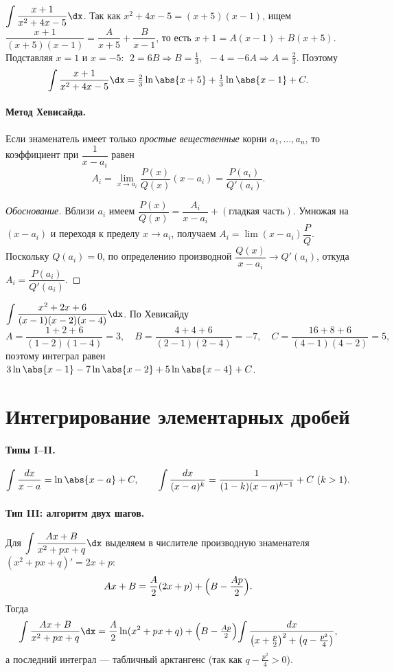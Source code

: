 \begin{example}
$\displaystyle\int\frac{x+1}{x^2+4x-5}\dx$. Так как $x^2+4x-5=(x+5)(x-1)$, ищем
$\dfrac{x+1}{(x+5)(x-1)}=\dfrac{A}{x+5}+\dfrac{B}{x-1}$, то есть $x+1=A(x-1)+B(x+5)$. Подставляя
$x=1$ и $x=-5$: $\;2=6B\Rightarrow B=\tfrac13$, $\;-4=-6A\Rightarrow A=\tfrac23$. Поэтому
\[
  \int\frac{x+1}{x^2+4x-5}\dx=\tfrac23\ln\abs{x+5}+\tfrac13\ln\abs{x-1}+C.
\]
\end{example}

\paragraph{Метод Хевисайда.} Если знаменатель имеет только \emph{простые вещественные} корни
$a_1,\dots,a_n$, то коэффициент при $\dfrac1{x-a_i}$ равен
\[
  A_i=\lim_{x\to a_i}\frac{P(x)}{Q(x)}(x-a_i)=\frac{P(a_i)}{Q'(a_i)} .
\]
\begin{proof}[Обоснование]
Вблизи $a_i$ имеем $\dfrac{P(x)}{Q(x)}=\dfrac{A_i}{x-a_i}+(\text{гладкая часть})$. Умножая на
$(x-a_i)$ и переходя к пределу $x\to a_i$, получаем $A_i=\lim(x-a_i)\dfrac{P}{Q}$. Поскольку
$Q(a_i)=0$, по определению производной $\dfrac{Q(x)}{x-a_i}\to Q'(a_i)$, откуда
$A_i=\dfrac{P(a_i)}{Q'(a_i)}$.
\end{proof}

\begin{example}
$\displaystyle\int\frac{x^2+2x+6}{(x-1)(x-2)(x-4)}\dx$. По Хевисайду
\[
  A=\frac{1+2+6}{(1-2)(1-4)}=3,\quad
  B=\frac{4+4+6}{(2-1)(2-4)}=-7,\quad
  C=\frac{16+8+6}{(4-1)(4-2)}=5,
\]
поэтому интеграл равен $3\ln\abs{x-1}-7\ln\abs{x-2}+5\ln\abs{x-4}+C$.
\end{example}

\section{Интегрирование элементарных дробей}

\paragraph{Типы I–II.}
\[
  \int\frac{dx}{x-a}=\ln\abs{x-a}+C,\qquad
  \int\frac{dx}{(x-a)^k}=\frac{1}{(1-k)(x-a)^{k-1}}+C\ (k>1).
\]

\paragraph{Тип III: алгоритм двух шагов.} Для $\displaystyle\int\frac{Ax+B}{x^2+px+q}\dx$
выделяем в числителе производную знаменателя $(x^2+px+q)'=2x+p$:
\[
  Ax+B=\frac{A}{2}(2x+p)+\Bigl(B-\frac{Ap}{2}\Bigr).
\]
Тогда
\[
  \int\frac{Ax+B}{x^2+px+q}\dx
   =\frac{A}{2}\ln(x^2+px+q)
   +\Bigl(B-\tfrac{Ap}{2}\Bigr)\!\int\frac{dx}{\bigl(x+\frac p2\bigr)^2+\bigl(q-\frac{p^2}4\bigr)} ,
\]
а последний интеграл — табличный арктангенс (так как $q-\tfrac{p^2}4>0$).

